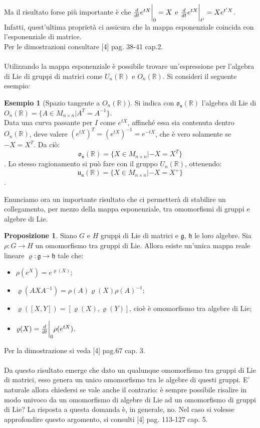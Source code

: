 \documentclass[12pt,a4paper]{report}
\theoremstyle{definition}
\newtheorem{Prop}[Def]{Proposizione}
\theoremstyle{definition}
\newtheorem{Ex}[Def]{Esempio}
\theoremstyle{definition}
\theoremstyle{definition}
\begin{document}
Ma il risultato forse più importante è che ${d\over dt}e^{tX}\bigg{\rvert}_0=X$ e ${d\over dt}e^{tX}\bigg{\rvert}_{t'}=Xe^{t'X}$.\\
Infatti, quest'ultima proprietà ci assicura che la mappa esponenziale coincida con l'esponenziale di matrice.\\
Per le dimostrazioni consultare [4] pag. 38-41 cap.2.\\
\\
Utilizzando la mappa esponenziale è possibile trovare un'espressione per l'algebra di Lie di gruppi di matrici come $U_n(\mathbb{R})$ e $O_n(\mathbb{R})$. Si consideri il seguente esempio:
\begin{Ex}[Spazio tangente a $O_n(\mathbb{R})$]
	Si indica con $\mathfrak{o_n(\mathbb{R})}$ l'algebra di Lie di $O_n(\mathbb{R})=\{A\in M_{n\times n}|A^T=A^{-1}\}$.\\
	Data una curva passante per $I$ come $e^{tX}$, affinché essa sia contenuta dentro $O_n(\mathbb{R})$, deve valere $(e^{tX})^T=(e^{tX})^{-1}=e^{-tX}$, che è vero solamente se $-X=X^T$. Da ciò: $$\mathfrak{o_n(\mathbb{R})}=\{X\in M_{n\times n}|-X=X^T\}$$.
	Lo stesso ragionamento si può fare con il gruppo $U_n(\mathbb{R})$, ottenendo: $$\mathfrak{u_n(\mathbb{R})}=\{X\in M_{n\times n}|-X=X^+\}$$.
\end{Ex}
Enunciamo ora un importante risultato che ci permetterà di stabilire un collegamento, per mezzo della mappa esponenziale, tra omomorfismi di gruppi e algebre di Lie.
\begin{Prop} \label{Prop: 2.4.1}
	Siano $G$ e $H$ gruppi di Lie di matrici e $\mathfrak{g}$, $\mathfrak{h}$ le loro algebre. Sia $\rho:G\rightarrow H$ un omomorfismo tra gruppi di Lie. Allora esiste un'unica mappa reale lineare $\varrho:\mathfrak{g}\rightarrow\mathfrak{h}$ tale che:
	\begin{itemize}
		\item $\rho(e^X)=e^{\varrho(X)}$; 
		\item $\varrho(AXA^{-1})=\rho(A)\varrho(X)\rho(A)^{-1}$;
		\item $\varrho([X,Y])=[\varrho(X),\varrho(Y)]$, cioè è omomorfismo tra algebre di Lie;
		\item $\varrho(X)={d\over dt}\bigg{\rvert}_0\rho(e^{tX})$.
	\end{itemize}
\end{Prop}
Per la dimostrazione si veda [4] pag.67 cap. 3.\\
\\
Da questo risultato emerge che dato un qualunque omomorfismo tra gruppi di Lie di matrici, esso genera un unico omomorfismo tra le algebre di questi gruppi. E' naturale allora chiedersi se vale anche il contrario: è sempre possibile risalire in modo univoco da un omomorfismo di algebre di Lie ad un omomorfismo di gruppi di Lie?
La risposta a questa domanda è, in generale, no. Nel caso si volesse approfondire questo argomento, si consulti [4] pag. 113-127 cap. 5.
\end{document}

